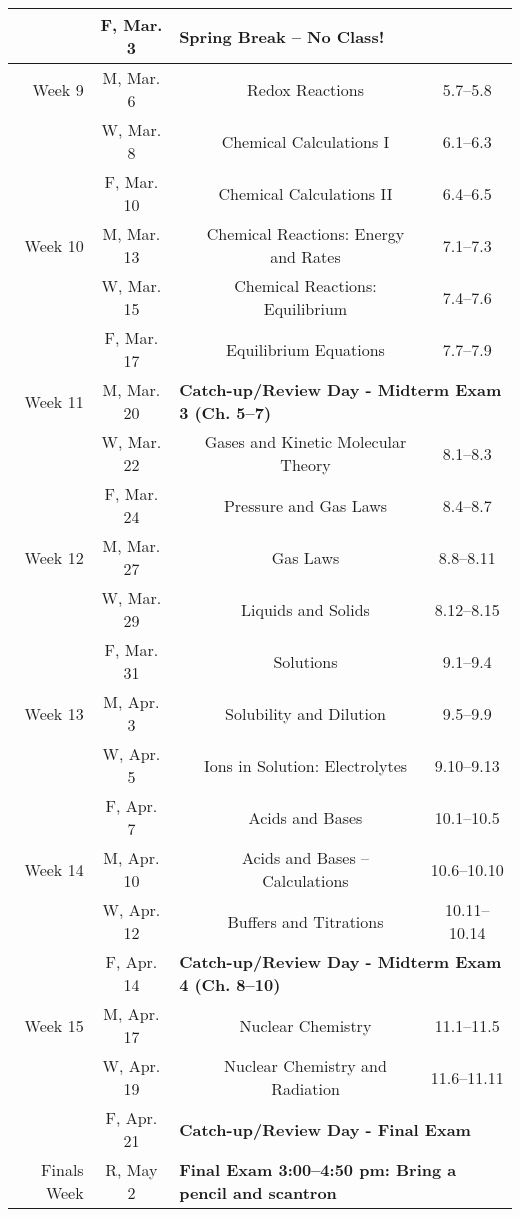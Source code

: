 \begin{tabular}{rcccc}
& F, Mar. 3& \multicolumn{3}{l}{\textbf{Spring Break -- No Class!}}\\
\midrule
Week 9 & M, Mar. 6&& Redox Reactions & 5.7--5.8\\
& W, Mar. 8&& Chemical Calculations I & 6.1--6.3\\
& F, Mar. 10&& Chemical Calculations II & 6.4--6.5\\
\midrule
Week 10 & M, Mar. 13&& Chemical Reactions: Energy and Rates & 7.1--7.3\\
& W, Mar. 15&& Chemical Reactions: Equilibrium & 7.4--7.6\\
& F, Mar. 17&& Equilibrium Equations & 7.7--7.9\\
\midrule
Week 11 & M, Mar. 20& \multicolumn{3}{l}{\textbf{Catch-up/Review Day - Midterm Exam 3 (Ch. 5--7)}}\\
& W, Mar. 22&& Gases and Kinetic Molecular Theory & 8.1--8.3\\
& F, Mar. 24&& Pressure and Gas Laws & 8.4--8.7\\
\midrule
Week 12 & M, Mar. 27&& Gas Laws & 8.8--8.11\\
& W, Mar. 29&& Liquids and Solids & 8.12--8.15\\
& F, Mar. 31&& Solutions & 9.1--9.4\\
\midrule
Week 13 & M, Apr. 3&& Solubility and Dilution & 9.5--9.9\\
& W, Apr. 5&& Ions in Solution: Electrolytes & 9.10--9.13\\
& F, Apr. 7&& Acids and Bases & 10.1--10.5\\
\midrule
Week 14 & M, Apr. 10&& Acids and Bases -- Calculations & 10.6--10.10\\
& W, Apr. 12&& Buffers and Titrations & 10.11--10.14\\
& F, Apr. 14& \multicolumn{3}{l}{\textbf{Catch-up/Review Day - Midterm Exam 4 (Ch. 8--10)}}\\
\midrule
Week 15 & M, Apr. 17&& Nuclear Chemistry & 11.1--11.5\\
& W, Apr. 19&& Nuclear Chemistry and Radiation & 11.6--11.11\\
& F, Apr. 21& \multicolumn{3}{l}{\textbf{Catch-up/Review Day - Final Exam}}\\
\midrule
Finals Week& R, May 2& \multicolumn{3}{l}{\textbf{Final Exam 3:00--4:50 pm: Bring a pencil and scantron}}\\
\end{tabular}